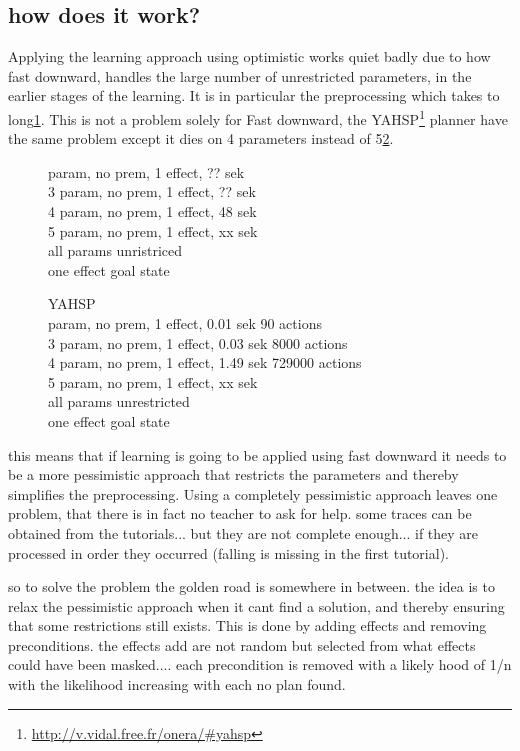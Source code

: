 \subsection{how does it work?}
Applying the learning approach using optimistic works quiet badly due to how fast downward, handles the large number of unrestricted parameters, in the earlier stages of the learning. It is in particular the preprocessing which takes to long\ref{opt-fd}. This is not a problem solely for Fast downward, the YAHSP\footnote{\url{http://v.vidal.free.fr/onera/\#yahsp}} planner have the same problem except it dies on 4 parameters instead of 5\ref{opt-ya}.
\begin{figure}
	\label{opt-fd}
	 param, no prem, 1 effect, ?? sek\\
	3 param, no prem, 1 effect, ?? sek\\
	4 param, no prem, 1 effect, 48 sek\\
	5 param, no prem, 1 effect, xx sek\\

	all params unristriced\\
	one effect goal state\\
\end{figure}
\begin{figure}
	YAHSP\\
	\label{opt-ya}
	 param, no prem, 1 effect, 0.01 sek 90 actions\\
	3 param, no prem, 1 effect, 0.03 sek 8000 actions\\
	4 param, no prem, 1 effect, 1.49 sek 729000 actions\\
	5 param, no prem, 1 effect, xx sek\\
	
	all params unrestricted\\
	one effect goal state\\
\end{figure}


this means that if learning is going to be applied using fast downward it needs to be a more pessimistic approach that restricts the parameters and thereby simplifies the preprocessing. Using a completely pessimistic approach leaves one problem, that there is in fact no teacher to ask for help. some traces can be obtained from the tutorials... but they are not complete enough... if they are processed in order they occurred (falling is missing in the first tutorial).  

so to solve the problem the golden road is somewhere in between. the idea is to relax the pessimistic approach when it cant find a solution, and thereby ensuring that some restrictions still exists. This is done by adding effects and removing preconditions. the effects add are not random but selected from what effects could have been masked.... each precondition is removed with a likely hood of 1/n with the likelihood increasing with each no plan found.

